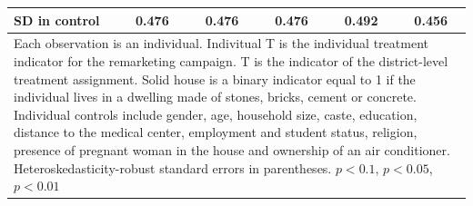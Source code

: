 {{\begin{tabular}{l*{5}{c}}
SD in control   &    0.476         &    0.476         &    0.476         &    0.492         &    0.456         \\
\hline\hline
\multicolumn{6}{p{0.85\linewidth}}{\scriptsize Each observation is an individual. Indivitual T is the individual treatment indicator for the remarketing campaign. T is the indicator of the district-level treatment assignment. Solid house is a binary indicator equal to 1 if the individual lives in a dwelling made of stones, bricks, cement or concrete. Individual controls include gender, age, household size, caste, education, distance to the medical center, employment and student status, religion, presence of pregnant woman in the house and ownership of an air conditioner. Heteroskedasticity-robust standard errors in parentheses. \sym{*} \(p<0.1\), \sym{**} \(p<0.05\), \sym{***} \(p<0.01\)}\\
\end{tabular}
}%

}
